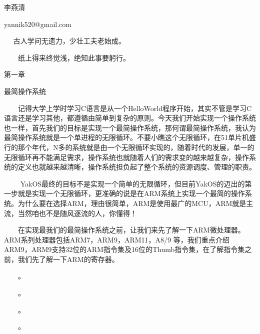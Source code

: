 \centerline{\bold 李燕清}
\centerline{\bold yannik520@gmail.com}
\medskip
{}

　    古人学问无遗力，少壮工夫老始成。
\par
　　纸上得来终觉浅，绝知此事要躬行。
\par
\medskip
\centerline{\bold 第一章}
\smallskip
\centerline{\bold 最简操作系统}
\medskip

　　记得大学上学时学习C语言是从一个HelloWorld程序开始，其实不管是学习C语言还是学习其他，都遵循由简单到复杂的原则。今天我们开始实现一个操作系统也一样，首先我们的目标是实现一个最简操作系统，那何谓最简操作系统，我认为最简操作系统就是一个单进程的无限循环。不要小瞧这个无限循环，在51单片机盛行的那个年代，N多的系统就是由一个无限循环实现的，随着时代的发展，单一的无限循环再不能满足需求，操作系统也就随着人们的需求变的越来越复杂，操作系统的定义也就越来越清晰，操作系统担负起了整个系统的资源调度、管理的职责。
\par
　　
	YakOS最终的目标不是实现一个简单的无限循环，但目前YakOS的迈出的第一步就是实现一个无限循环，更准确的说是在ARM系统上实现一个最简的操作系统。为什么要在选择ARM，理由很简单，ARM是使用最广的MCU，ARM就是主流，当然咱也不是随风逐流的人，你懂得！
\par
	
　　在实现最我们的最简操作系统之前，让我们来先了解一下ARM微处理器。ARM系列处理器包括ARM7，ARM9，ARM11，A8/9 等，我们重点介绍ARM9，ARM9支持32位的ARM指令集及16位的Thumb指令集，在了解指令集之前，我们先了解一下ARM的寄存器。
\par

　　。
\par

　　。
\par

　　。
\par

　　。
\bye
